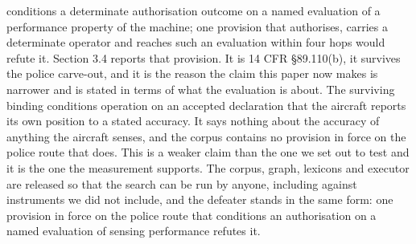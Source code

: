 conditions a determinate authorisation outcome on a named evaluation of a performance property of the machine; one provision that authorises, carries a determinate operator and reaches such an evaluation within four hops would refute it. Section 3.4 reports that provision. It is 14 CFR \S{}89.110(b), it survives the police carve-out, and it is the reason the claim this paper now makes is narrower and is stated in terms of what the evaluation is about. The surviving binding conditions operation on an accepted declaration that the aircraft reports its own position to a stated accuracy. It says nothing about the accuracy of anything the aircraft senses, and the corpus contains no provision in force on the police route that does. This is a weaker claim than the one we set out to test and it is the one the measurement supports. The corpus, graph, lexicons and executor are released so that the search can be run by anyone, including against instruments we did not include, and the defeater stands in the same form: one provision in force on the police route that conditions an authorisation on a named evaluation of sensing performance refutes it.
